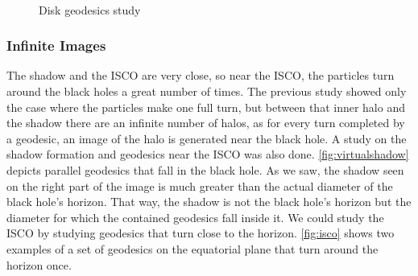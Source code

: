 \begin{figure}[bth]
	\myfloatalign
	 \quad
	 \\
	 \quad
	\caption[Disk geodesics study]{Disk geodesics study}\label{fig:diskgeodesicstudy}
\end{figure}

\subsubsection*{Infinite Images}

The shadow and the \ac{ISCO} are very close, so near the \ac{ISCO}, the particles turn around the black holes a great number of times. The previous study showed only the case where the particles make one full turn, but between that inner halo and the shadow there are an infinite number of halos, as for every turn completed by a geodesic, an image of the halo is generated near the black hole. A study on the shadow formation and geodesics near the \ac{ISCO} was also done. \autoref{fig:virtualshadow} depicts parallel geodesics that fall in the black hole. As we saw, the shadow seen on the right part of the image is much greater than the actual diameter of the black hole's horizon. That way, the shadow is not the black hole's horizon but the diameter for which the contained geodesics fall inside it. We could study the \ac{ISCO} by studying geodesics that turn close to the horizon. \autoref{fig:isco} shows two examples of a set of geodesics on the equatorial plane that turn around the horizon once.


